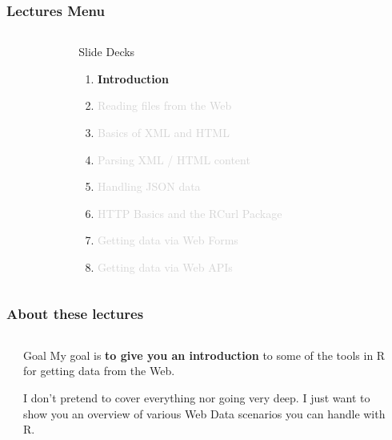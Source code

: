 \documentclass{beamer}\usepackage[]{graphicx}\usepackage[]{color}
\begin{document}
\begin{frame}
\frametitle{Lectures Menu}

\begin{columns}[t]
\begin{column}{0.1\textwidth}
\end{column}
\begin{column}{0.8\textwidth}
 \begin{block}{Slide Decks}
  \begin{enumerate}
   \item \textbf{Introduction}
   \item \textcolor{lightgray}{Reading files from the Web}
   \item \textcolor{lightgray}{Basics of XML and HTML}
   \item \textcolor{lightgray}{Parsing XML / HTML content}
   \item \textcolor{lightgray}{Handling JSON data}
   \item \textcolor{lightgray}{HTTP Basics and the RCurl Package}   
   \item \textcolor{lightgray}{Getting data via Web Forms}
   \item \textcolor{lightgray}{Getting data via Web APIs}
  \end{enumerate}
 \end{block}
\end{column}
\begin{column}{0.1\textwidth}
\end{column}
\end{columns}

\end{frame}


\begin{frame}
\frametitle{About these lectures}

\begin{columns}[t]
\begin{column}{0.1\textwidth}
\end{column}
\begin{column}{0.8\textwidth}
\begin{block}{Goal}
My goal is \textbf{to give you an introduction} to some of the tools in R for getting data from the Web.

\bigskip
I don't pretend to cover everything nor going very deep. I just want to show you an overview of various Web Data scenarios you can handle with R.
\end{block}
\end{column}
\begin{column}{0.1\textwidth}
\end{column}
\end{columns}

\end{frame}
\end{document}
